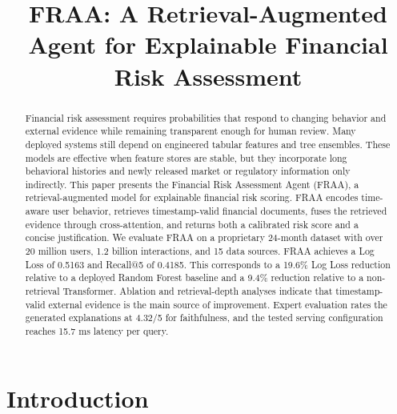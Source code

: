 \documentclass[runningheads]{llncs}
\title{FRAA: A Retrieval-Augmented Agent for Explainable Financial Risk Assessment}
\author{}
\institute{}
\begin{document}
\maketitle

\begin{abstract}
Financial risk assessment requires probabilities that respond to changing behavior and external evidence while remaining transparent enough for human review. Many deployed systems still depend on engineered tabular features and tree ensembles. These models are effective when feature stores are stable, but they incorporate long behavioral histories and newly released market or regulatory information only indirectly. This paper presents the Financial Risk Assessment Agent (FRAA), a retrieval-augmented model for explainable financial risk scoring. FRAA encodes time-aware user behavior, retrieves timestamp-valid financial documents, fuses the retrieved evidence through cross-attention, and returns both a calibrated risk score and a concise justification. We evaluate FRAA on a proprietary 24-month dataset with over 20 million users, 1.2 billion interactions, and 15 data sources. FRAA achieves a Log Loss of 0.5163 and Recall@5 of 0.4185. This corresponds to a 19.6\% Log Loss reduction relative to a deployed Random Forest baseline and a 9.4\% reduction relative to a non-retrieval Transformer. Ablation and retrieval-depth analyses indicate that timestamp-valid external evidence is the main source of improvement. Expert evaluation rates the generated explanations at 4.32/5 for faithfulness, and the tested serving configuration reaches 15.7 ms latency per query.

\end{abstract}

\section{Introduction}
\end{document}
